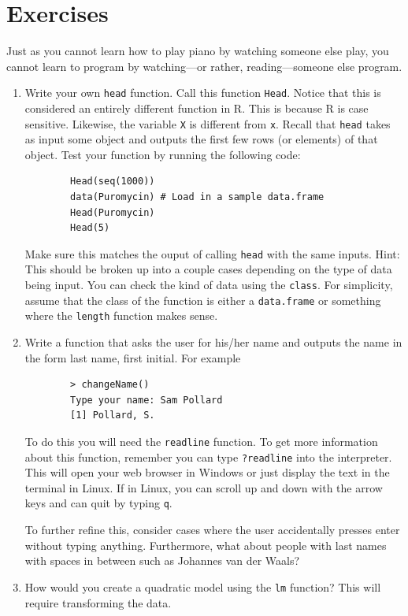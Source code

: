 \documentclass[12pt]{article}
\theoremstyle{remark}
\begin{document}
\newpage
\part{Exercises}

Just as you cannot learn how to play piano by watching someone else play, you cannot learn to program by watching---or rather, reading---someone else program.

\begin{enumerate}
	\item { Write your own \verb|head| function. Call this function \verb|Head|. Notice that this is considered an entirely different function in R. This is because R is case sensitive. Likewise, the variable \verb|X| is different from \verb|x|. Recall that \verb|head| takes as input some object and outputs the first few rows (or elements) of that object. Test your function by running the following code:
	\begin{verbatim}
		Head(seq(1000))
		data(Puromycin) # Load in a sample data.frame
		Head(Puromycin)
		Head(5)
	\end{verbatim}
	Make sure this matches the ouput of calling \verb|head| with the same inputs. Hint: This should be broken up into a couple cases depending on the type of data being input. You can check the kind of data using the \verb|class|. For simplicity, assume that the class of the function is either a \verb|data.frame| or something where the \verb|length| function makes sense.
	}
	
	\item { Write a function that asks the user for his/her name and outputs the name in the form last name, first initial. For example
	\begin{verbatim}
		> changeName()
		Type your name: Sam Pollard
		[1] Pollard, S.
	\end{verbatim}
	
	To do this you will need the \verb|readline| function. To get more information about this function, remember you can type \verb|?readline| into the interpreter. This will open your web browser in Windows or just display the text in the terminal in Linux. If in Linux, you can scroll up and down with the arrow keys and can quit by typing \verb|q|.
	
	To further refine this, consider cases where the user accidentally presses enter without typing anything. Furthermore, what about people with last names with spaces in between such as Johannes van der Waals?
	}
	
	\item { How would you create a quadratic model using the \verb|lm| function? This will require transforming the data.
	}

\end{enumerate}
\end{document}
